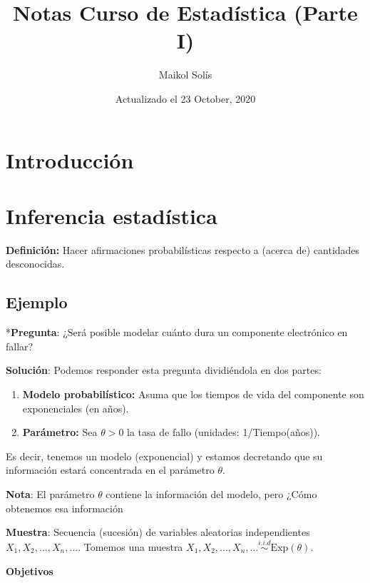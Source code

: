 \documentclass[
  12pt,
]{book}
\title{Notas Curso de Estadística (Parte I)}
\author{Maikol Solís}
\date{Actualizado el 23 October, 2020}
\providecommand{\tightlist}{%
  \setlength{\itemsep}{0pt}\setlength{\parskip}{0pt}}
\begin{document}
\maketitle

{
\hypersetup{linkcolor=}
\setcounter{tocdepth}{4}
\tableofcontents
}
\hypertarget{introducciuxf3n}{%
\chapter{Introducción}\label{introducciuxf3n}}

\hypertarget{inferencia-estaduxedstica}{%
\chapter{Inferencia estadística}\label{inferencia-estaduxedstica}}

\textbf{Definición:} Hacer afirmaciones probabilísticas respecto a (acerca de)
cantidades desconocidas.

\hypertarget{ejemplo}{%
\section{Ejemplo}\label{ejemplo}}

*\textbf{Pregunta}: ¿Será posible modelar cuánto dura un componente electrónico en
fallar?

\textbf{Solución}: Podemos responder esta pregunta dividiéndola en dos partes:

\begin{enumerate}
\def\labelenumi{\arabic{enumi}.}
\tightlist
\item
  \textbf{Modelo probabilístico:} Asuma que los tiempos de vida del componente son
  exponenciales (en años).
\item
  \textbf{Parámetro:} Sea \(\theta > 0\) la tasa de fallo (unidades: 1/Tiempo(años)).
\end{enumerate}

Es decir, tenemos un modelo (exponencial) y estamos decretando que su información estará concentrada en el parámetro \(\theta\).

\textbf{Nota}: El parámetro \(\theta\) contiene la información del modelo,
pero ¿Cómo obtenemos esa información

\textbf{Muestra}: Secuencia (sucesión) de variables aleatorias independientes \(X_1,X_2,\dots, X_n,\dots\). Tomemos una muestra \(X_1,X_2,\dots, X_n,\dots \stackrel{i.i.d}{\sim} \text{Exp}(\theta)\).

\textbf{Objetivos}
\end{document}
